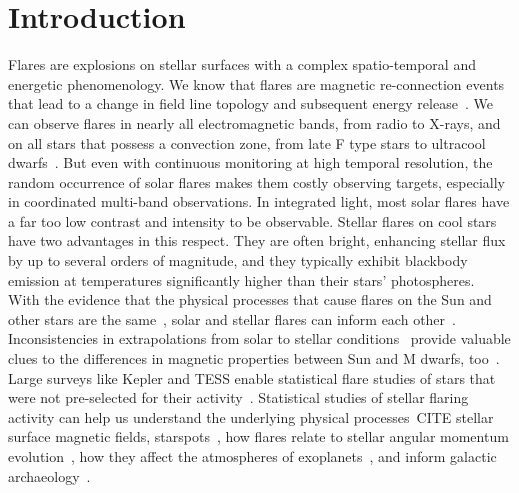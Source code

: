 \documentclass{aa}
\begin{document}

   \maketitle

\section{Introduction}
Flares are explosions on stellar surfaces with a complex spatio-temporal and energetic phenomenology. We know that flares are magnetic re-connection events that lead to a change in field line topology and subsequent energy release~\citep{priest_magnetic_2002}. We can observe flares in nearly all electromagnetic bands, from radio %
to X-rays, and on all stars that possess a convection zone, from late F type stars to ultracool dwarfs~\citep{gizis_kepler_2013}. But even with continuous monitoring at high temporal resolution, the random occurrence of solar flares makes them costly observing targets, especially in coordinated multi-band observations. In integrated light, most solar flares have a far too low contrast and intensity to be observable. Stellar flares on cool stars have two advantages in this respect. They are often bright, enhancing stellar flux by up to several orders of magnitude, and they typically exhibit blackbody emission at temperatures significantly higher than their stars' photospheres.
\\
With the evidence that the physical processes that cause flares on the Sun and other stars are the same~\citep{karoff_observational_2016}, solar and stellar flares can inform each other~\citep{shibayama_2013}. Inconsistencies in extrapolations from solar to stellar conditions~\citep{Aarnio2011, aarnio_masslosscme_2012, drake_cmemassloss_2013} provide valuable clues to the differences in magnetic properties between Sun and M dwarfs, too~\citep{alvaradogomez_cme_2018}. Large surveys like Kepler and TESS enable statistical flare studies of stars that were not pre-selected for their activity~\citep{walkowicz_white-light_2011}. Statistical studies of stellar flaring activity can help us understand the underlying physical processes~CITE stellar surface magnetic fields, starspots~\citep{davenport_flaresandspots_2015, howard_evryflare2arxiv_2019}, how flares relate to stellar angular momentum evolution~\citep{mondrik_flarerotation_2019, howard_evryflare2arxiv_2019}, how they affect the atmospheres of exoplanets~\citep{lecavelier_flareescape_2012, loyd_mflaresplanetsfuv_2018, tilley_repeated_flare_2019, howard_evryflare_2019}, and inform galactic archaeology~\citep{howard_evryflare_2019}. %
\end{document}
